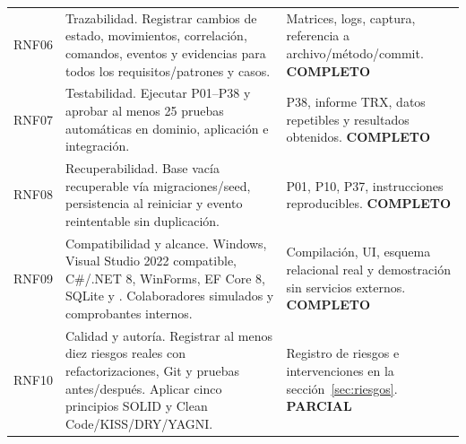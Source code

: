 \begin{longtable}{@{}L{.09\linewidth}L{.47\linewidth}L{.35\linewidth}@{}}
RNF06 & Trazabilidad. Registrar cambios de estado, movimientos, correlación, comandos, eventos y evidencias para todos los requisitos/patrones y casos. & Matrices, logs, captura, referencia a archivo/método/commit. \textbf{COMPLETO} \\[2pt]
RNF07 & Testabilidad. Ejecutar P01–P38 y aprobar al menos 25 pruebas automáticas en dominio, aplicación e integración. & P38, informe TRX, datos repetibles y resultados obtenidos. \textbf{COMPLETO} \\[2pt]
RNF08 & Recuperabilidad. Base vacía recuperable vía migraciones/seed, persistencia al reiniciar y evento reintentable sin duplicación. & P01, P10, P37, instrucciones reproducibles. \textbf{COMPLETO} \\[2pt]
RNF09 & Compatibilidad y alcance. Windows, Visual Studio 2022 compatible, C\#/.NET 8, WinForms, EF Core 8, SQLite y . Colaboradores simulados y comprobantes internos. & Compilación, UI, esquema relacional real y demostración sin servicios externos. \textbf{COMPLETO} \\[2pt]
RNF10 & Calidad y autoría. Registrar al menos diez riesgos reales con refactorizaciones, Git y pruebas antes/después. Aplicar cinco principios SOLID y Clean Code/KISS/DRY/YAGNI. & Registro de riesgos e intervenciones en la sección~\ref{sec:riesgos}. \textbf{PARCIAL} \\[2pt]
\bottomrule\end{longtable}\normalsize
